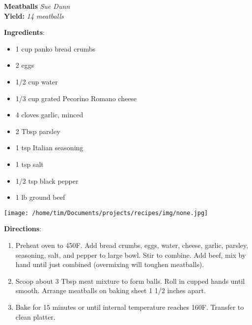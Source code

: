 \documentclass[11pt, twoside, openany]{book}
\begin{document}
\noindent\begin{minipage}[t]{\linewidth}%
{\Large\textbf{Meatballs}} \label{meatballs}\hfill\textit{Sue Dunn}\\
\textbf{Yield:} \textit{14 meatballs}\\
\noindent\begin{minipage}[t]{0.78\linewidth}%
\textbf{Ingredients}:\vspace{-3mm}
\begin{multicols}{2}
\begin{itemize}\setlength\itemsep{-1mm}
\item 1 cup panko bread crumbs
\item 2 eggs
\item 1/2 cup water
\item 1/3 cup grated Pecorino Romano cheese
\item 4 cloves garlic, minced
\item 2 Tbsp parsley
\item 1 tsp Italian seasoning
\item 1 tsp salt
\item 1/2 tsp black pepper
\item 1 lb ground beef
\end{itemize}
\end{multicols}
\end{minipage}
\noindent\begin{minipage}[t]{0.18\linewidth}
\centering \strut\vspace*{-\baselineskip}\newline
\texttt{[image: /home/tim/Documents/projects/recipes/img/none.jpg]}\\
\end{minipage}\vspace{3mm}
\textbf{Directions}:
\vspace{-3mm}\begin{enumerate}\setlength\itemsep{-1mm}
\item Preheat oven to 450F. Add bread crumbs, eggs, water, cheese, garlic, parsley, seasoning, salt, and pepper to large bowl. Stir to combine. Add beef, mix by hand until just combined (overmixing will toughen meatballs).
\item Scoop about 3 Tbsp meat mixture to form balls. Roll in cupped hands until smooth. Arrange meatballs on baking sheet 1 1/2 inches apart.
\item Bake for 15 minutes or until internal temperature reaches 160F. Transfer to clean platter.
\end{enumerate}
\end{minipage}\vspace{8mm}
\end{document}
